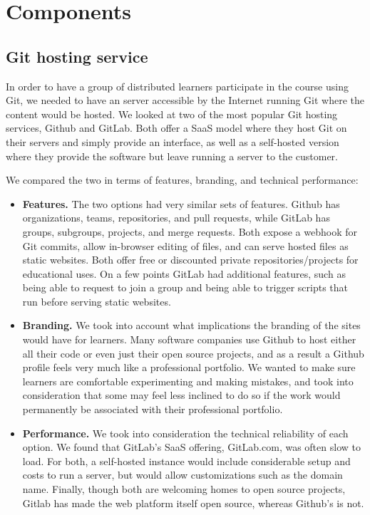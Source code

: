 \documentclass[12pt,twoside,vi]{mitthesis}
\begin{document}
\section{Components}

\subsection{Git hosting service}

In order to have a group of distributed learners participate in the course using Git, we needed to have an server accessible by the Internet running Git where the content would be hosted. We looked at two of the most popular Git hosting services, Github and GitLab. Both offer a SaaS model where they host Git on their servers and simply provide an interface, as well as a self-hosted version where they provide the software but leave running a server to the customer.

We compared the two in terms of features, branding, and technical performance:

\begin{itemize}
\item \textbf{Features.} The two options had very similar sets of features. Github has organizations, teams, repositories, and pull requests, while GitLab has groups, subgroups, projects, and merge requests. Both expose a webhook for Git commits, allow in-browser editing of files, and can serve hosted files as static websites. Both offer free or discounted private repositories/projects for educational uses. On a few points GitLab had additional features, such as being able to request to join a group and being able to trigger scripts that run before serving static websites.
\item \textbf{Branding.} We took into account what implications the branding of the sites would have for learners. Many software companies use Github to host either all their code or even just their open source projects, and as a result a Github profile feels very much like a professional portfolio. We wanted to make sure learners are comfortable experimenting and making mistakes, and took into consideration that some may feel less inclined to do so if the work would permanently be associated with their professional portfolio. 
\item \textbf{Performance.} We took into consideration the technical reliability of each option. We found that GitLab's SaaS offering, GitLab.com, was often slow to load. For both, a self-hosted instance would include considerable setup and costs to run a server, but would allow customizations such as the domain name. Finally, though both are welcoming homes to open source projects, Gitlab has made the web platform itself open source, whereas Github's is not.
\end{itemize}
\end{document}
